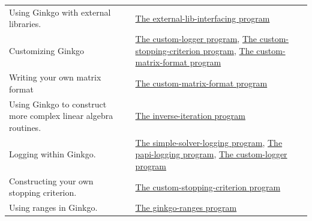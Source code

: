 \tabulinesep=1mm
\begin{longtabu} spread 0pt [c]{*{2}{|X[-1]}|}
\hline
Using Ginkgo with external libraries.  &\hyperlink{external_lib_interfacing}{The external-\/lib-\/interfacing program}  

\\
Customizing Ginkgo  &\hyperlink{custom_logger}{The custom-\/logger program}, \hyperlink{custom_stopping_criterion}{The custom-\/stopping-\/criterion program}, \hyperlink{custom_matrix_format}{The custom-\/matrix-\/format program}  

\\
Writing your own matrix format  &\hyperlink{custom_matrix_format}{The custom-\/matrix-\/format program}  

\\
Using Ginkgo to construct more complex linear algebra routines.  &\hyperlink{inverse_iteration}{The inverse-\/iteration program}  

\\
Logging within Ginkgo.  &\hyperlink{simple_solver_logging}{The simple-\/solver-\/logging program}, \hyperlink{papi_logging}{The papi-\/logging program}, \hyperlink{custom_logger}{The custom-\/logger program}  

\\
Constructing your own stopping criterion.  &\hyperlink{custom_stopping_criterion}{The custom-\/stopping-\/criterion program}  

\\
Using ranges in Ginkgo.  &\hyperlink{ginkgo_ranges}{The ginkgo-\/ranges program}   \\
\end{longtabu}
